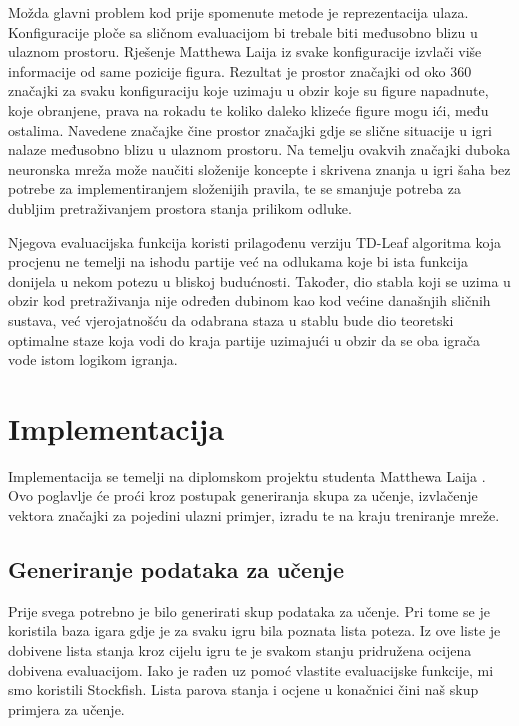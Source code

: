 \documentclass[journal]{IEEEtran}
\begin{document}
Možda glavni problem kod prije spomenute metode je reprezentacija ulaza. Konfiguracije ploče sa sličnom evaluacijom bi trebale biti međusobno blizu u ulaznom prostoru. Rješenje Matthewa Laija iz svake konfiguracije izvlači više informacije od same pozicije figura. Rezultat je prostor značajki od oko 360 značajki za svaku konfiguraciju koje uzimaju u obzir koje su figure napadnute, koje obranjene, prava na rokadu te koliko daleko klizeće figure mogu ići, među ostalima. Navedene značajke čine prostor značajki gdje se slične situacije u igri nalaze međusobno blizu u ulaznom prostoru. Na temelju ovakvih značajki duboka neuronska mreža može naučiti složenije koncepte i skrivena znanja u igri šaha bez potrebe za implementiranjem složenijih pravila, te se smanjuje potreba za dubljim pretraživanjem prostora stanja prilikom odluke.

Njegova evaluacijska funkcija koristi prilagođenu verziju TD-Leaf algoritma koja procjenu ne temelji na ishodu partije već na odlukama koje bi ista funkcija donijela u nekom potezu u bliskoj budućnosti. Također, dio stabla koji se uzima u obzir kod pretraživanja nije određen dubinom kao kod većine današnjih sličnih sustava, već vjerojatnošću da odabrana staza u stablu bude dio teoretski optimalne staze koja vodi do kraja partije uzimajući u obzir da se oba igrača vode istom logikom igranja.





\section{Implementacija}
Implementacija se temelji na diplomskom projektu studenta Matthewa Laija \cite{giraffe}. Ovo poglavlje će proći kroz postupak generiranja skupa za učenje, izvlačenje vektora značajki za pojedini ulazni primjer, izradu te na kraju treniranje mreže.
\subsection{Generiranje podataka za učenje}
Prije svega potrebno je bilo generirati skup podataka za učenje. Pri tome se je koristila baza igara gdje je za svaku igru bila poznata lista poteza. Iz ove liste je dobivene lista stanja kroz cijelu igru te je svakom stanju pridružena ocijena dobivena evaluacijom. Iako je \cite{giraffe} rađen uz pomoć vlastite evaluacijske funkcije, mi smo koristili Stockfish. Lista parova stanja i ocjene u konačnici čini naš skup primjera za učenje.
\end{document}
